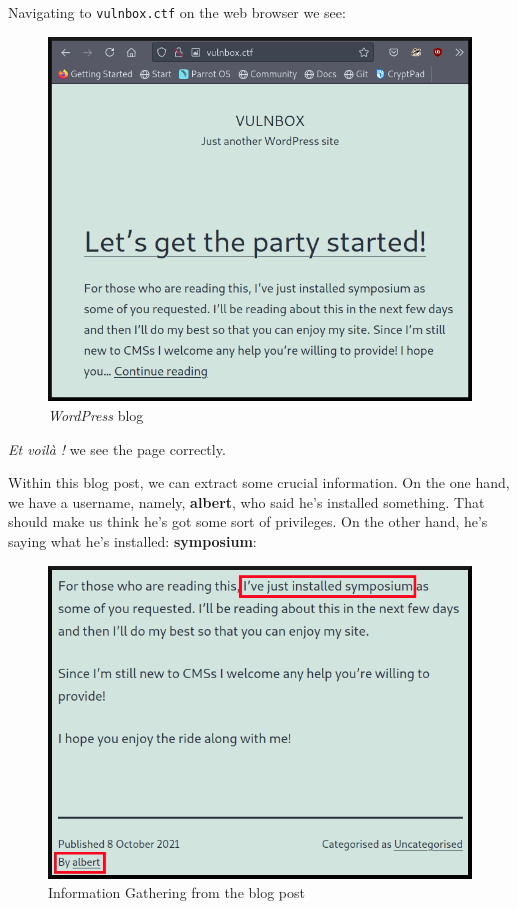 \documentclass[12pt]{article}
\begin{document}
    Navigating to \texttt{vulnbox.ctf} on the web browser we see:

    \begin{figure}[H]\label{pic:12-browser-vulnbox}
        \centering
        \includegraphics[width=1.00\textwidth]{12-browser-vulnbox.png}
        \caption{\textit{WordPress} blog}
    \end{figure}

    \textit{Et voilà !} we see the page correctly.

    Within this blog post, we can extract some crucial information. On the one
    hand, we have a username, namely, \textbf{albert}, who said he's installed
    something. That should make us think he's got some sort of privileges. On
    the other hand, he's saying what he's installed: \textbf{symposium}:

    \begin{figure}[H]\label{pic:13-browser-albert}
        \centering
        \includegraphics[width=1.00\textwidth]{13-browser-albert.png}
        \caption{Information Gathering from the blog post}
    \end{figure}
\end{document}
